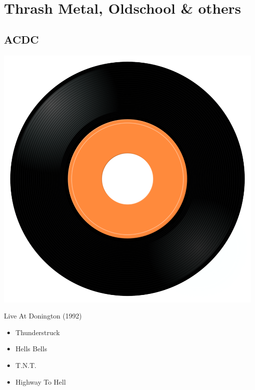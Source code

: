 
\section{Thrash Metal, Oldschool \& others}

\subsection{ACDC}

\begin{minipage}[t]{0.25\textwidth}
\captionsetup{type=figure}
\includegraphics[width=\textwidth]{Images/cover.png}
\caption*{Live At Donington (1992)}
\end{minipage}
\begin{minipage}[t]{0.25\textwidth}\vspace{0pt}
\begin{itemize}[nosep,leftmargin=1em,labelwidth=*,align=left]
	\setlength{\itemsep}{0pt}
	\item Thunderstruck
	\item Hells Bells
	\item T.N.T.
	\item Highway To Hell
\end{itemize}
\end{minipage}


